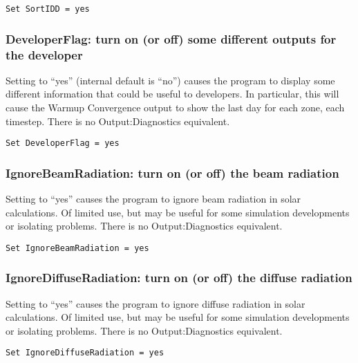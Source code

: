 \begin{lstlisting}
Set SortIDD = yes
\end{lstlisting}

\subsubsection{DeveloperFlag: turn on (or off) some different outputs for the developer}\label{developerflag-turn-on-or-off-some-different-outputs-for-the-developer}

Setting to ``yes'' (internal default is ``no'') causes the program to display some different information that could be useful to developers. In particular, this will cause the Warmup Convergence output to show the last day for each zone, each timestep. There is no Output:Diagnostics equivalent.

\begin{lstlisting}
Set DeveloperFlag = yes
\end{lstlisting}

\subsubsection{IgnoreBeamRadiation: turn on (or off) the beam radiation}\label{ignorebeamradiation-turn-on-or-off-the-beam-radiation}

Setting to ``yes'' causes the program to ignore beam radiation in solar calculations. Of limited use, but may be useful for some simulation developments or isolating problems. There is no Output:Diagnostics equivalent.

\begin{lstlisting}
Set IgnoreBeamRadiation = yes
\end{lstlisting}

\subsubsection{IgnoreDiffuseRadiation: turn on (or off) the diffuse radiation}\label{ignorediffuseradiation-turn-on-or-off-the-diffuse-radiation}

Setting to ``yes'' causes the program to ignore diffuse radiation in solar calculations. Of limited use, but may be useful for some simulation developments or isolating problems. There is no Output:Diagnostics equivalent.

\begin{lstlisting}
Set IgnoreDiffuseRadiation = yes
\end{lstlisting}

